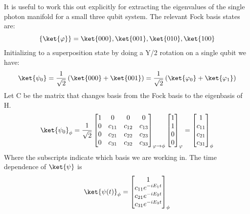 It is useful to work this out explicitly for extracting the eigenvalues of the single photon manifold for a small three qubit system.  %
The relevant Fock basis states are:
\begin{equation}
    \{\ket{\varphi\}} = \ket{000}, \ket{001}, \ket{010}, \ket{100}
\end{equation}
Initializing to a superposition state by doing a Y/2 rotation on a single qubit we have:
\begin{equation*}
    \ket{\psi_0} = \frac{1}{\sqrt{2}} \left( \ket{000} + \ket{001} \right) = \frac{1}{\sqrt{2}} \left( \ket{\varphi_0} + \ket{\varphi_1} \right)
\end{equation*}
Let C be the matrix that changes basis from the Fock basis to the eigenbasis of H.
\begin{equation}
    \ket{\psi_0}_{\phi} = \frac{1}{\sqrt{2}}
    \begin{bmatrix}
        1 & 0 & 0 & 0 \\
        0 & c_{11} & c_{12} & c_{13} \\
        0 & c_{21} & c_{22} & c_{23} \\
        0 & c_{31} & c_{32} & c_{33} \\
    \end{bmatrix}_{\varphi \rightarrow \phi}
    \begin{bmatrix}
        1 \\
        1 \\
        0 \\
        0 \\
    \end{bmatrix}_{\varphi}
    =
    \begin{bmatrix}
        1 \\
        c_{11} \\
        c_{21} \\
        c_{31} \\
    \end{bmatrix}_{\phi}
\end{equation}
Where the subscripts indicate which basis we are working in.
The time dependence of $\ket{\psi}$ is
\begin{equation}
    \ket{\psi(t)}_{\phi} =
    \begin{bmatrix}
        1 \\
        c_{11} e^{-i E_1 t} \\
        c_{21} e^{-i E_2 t} \\
        c_{31} e^{-i E_3 t}\\
    \end{bmatrix}_{\phi}
\end{equation}

